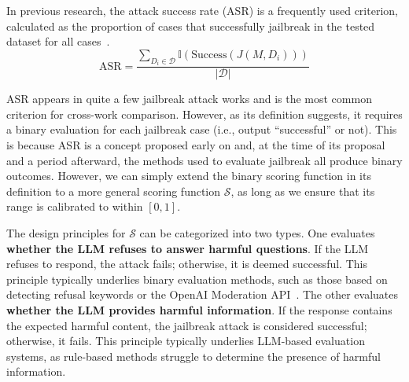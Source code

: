 In previous research, the attack success rate (ASR) is a frequently used criterion, calculated as the proportion of cases that successfully jailbreak in the tested dataset for all cases~\cite{23gcg}.
\begin{equation}
    \text{ASR} = \frac{\sum_{D_i \in \mathcal{D}} \mathbb{I}(\text{Success}(J(M,D_i)))}{|\mathcal{D}|}
\end{equation}

ASR appears in quite a few jailbreak attack works and is the most common criterion for cross-work comparison. However, as its definition suggests, it requires a binary evaluation for each jailbreak case (i.e., output ``successful'' or not). This is because ASR is a concept proposed early on and, at the time of its proposal and a period afterward, the methods used to evaluate jailbreak all produce binary outcomes. However, we can simply extend the binary scoring function in its definition to a more general scoring function $\mathcal{S}$, as long as we ensure that its range is calibrated to within $[0,1]$.

The design principles for $\mathcal{S}$ can be categorized into two types. One evaluates \textbf{whether the LLM refuses to answer harmful questions}. If the LLM refuses to respond, the attack fails; otherwise, it is deemed successful. This principle typically underlies binary evaluation methods, such as those based on detecting refusal keywords or the OpenAI Moderation API~\cite{openai_moderations_api}. The other evaluates \textbf{whether the LLM provides harmful information}. If the response contains the expected harmful content, the jailbreak attack is considered successful; otherwise, it fails. This principle typically underlies LLM-based evaluation systems, as rule-based methods struggle to determine the presence of harmful information.